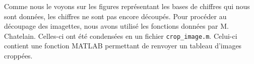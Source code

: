 Comme nous le voyons sur les figures représentant les bases 
de chiffres qui nous sont données, les chiffres ne sont pas 
encore découpés. Pour procéder au découpage des imagettes, nous
avons utilisé les fonctions données par M. Chatelain. Celles-ci
ont été condensées en un fichier \texttt{crop\_image.m}. Celui-ci
contient une fonction MATLAB permettant de renvoyer un tableau 
d'images croppées.